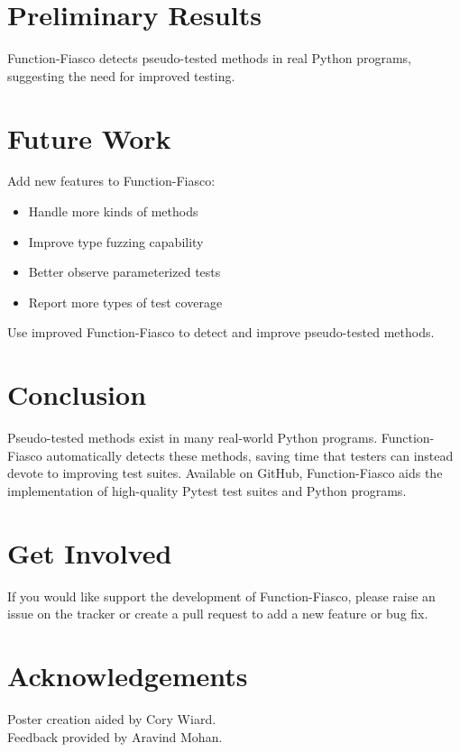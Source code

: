 \documentclass[a0paper,fleqn]{betterposter}
\begin{document}
{  }{


  \vspace*{-.5in}
  \section{Preliminary Results}

  \vspace*{-1in}


  \vspace*{-.5in}

  Function-Fiasco detects pseudo-tested methods in real Python programs,
  suggesting the need for improved testing.

  \section{Future Work}
  Add new features to Function-Fiasco: \\
  \vspace*{-.5in}

  \begin{itemize}[leftmargin=*]

    \item{Handle more kinds of methods}
    \item{Improve type fuzzing capability}
    \item{Better observe parameterized tests}
    \item{Report more types of test coverage}

  \end{itemize}

  \vspace{.5em}
  Use improved Function-Fiasco to detect and improve pseudo-tested methods.

  \section{Conclusion}
  Pseudo-tested methods exist in many real-world Python programs.
  Function-Fiasco automatically detects these methods, saving time that testers
  can instead devote to improving test suites.
  Available on GitHub, Function-Fiasco aids the implementation of high-quality
  Pytest test suites and Python programs.

  \section{Get Involved}
  If you would like support the development of Function-Fiasco, please raise an
  issue on the tracker or create a pull request to add a new feature or bug
  fix.
  \vfill

  \section{Acknowledgements}
  Poster creation aided by Cory Wiard.\\
  Feedback provided by Aravind Mohan.\\


}
\end{document}
